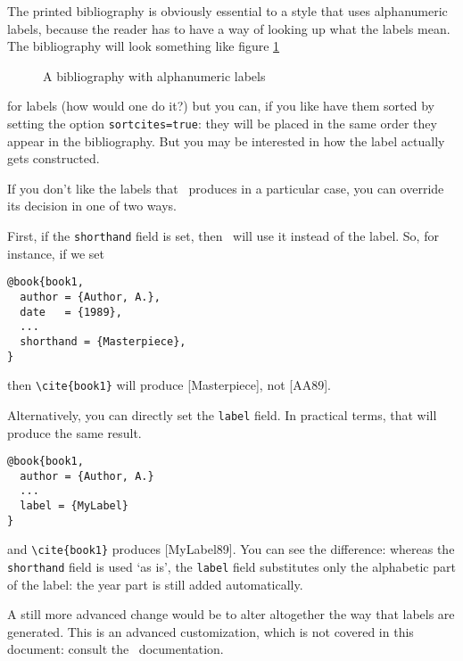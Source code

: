 The printed bibliography is obviously essential to a style that uses
alphanumeric labels, because the reader has to have a way of looking
up what the labels mean. The bibliography will look something like
figure \ref{example:bibliography:alphabetic}

\begin{figure}
\caption{A bibliography with alphanumeric
  labels\label{example:bibliography:alphabetic}}
\end{figure}

 for labels (how
would one do it?) but you can, if you like have them sorted by setting
the option \verb|sortcites=true|: they will be placed in the same
order they appear in the bibliography. But you may be interested in
how the label actually gets constructed.

If you don't like the labels that \biblatex\ produces in a particular
case, you can override its decision in one of two ways.

First, if the \verb|shorthand| field is set, then \biblatex\ will use
it instead of the label. So, for instance, if we set
\begin{verbatim}
@book{book1,
  author = {Author, A.},
  date   = {1989},
  ...
  shorthand = {Masterpiece},
}
\end{verbatim}
then \verb|\cite{book1}| will produce [Masterpiece], not [AA89].

Alternatively, you can directly set the \verb|label| field. In
practical terms, that will produce the same result.
\begin{verbatim}
@book{book1,
  author = {Author, A.}
  ...
  label = {MyLabel}
}
\end{verbatim}
and \verb|\cite{book1}| produces [MyLabel89]. You can see the difference:
whereas the \verb|shorthand| field is used `as is', the \verb|label|
field substitutes only the alphabetic part of the label: the year part
is still added automatically.

A still more advanced change would be to alter altogether the way that
labels are generated. This is an advanced customization, which is not
covered in this document: consult the \biblatex\
documentation.


